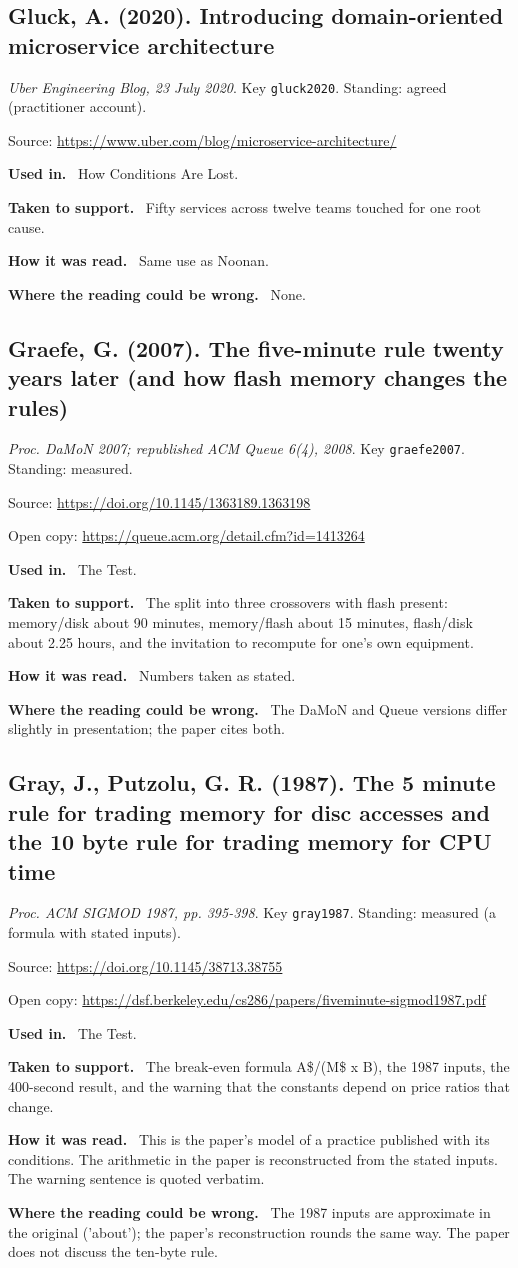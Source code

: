 \documentclass[11pt,oneside]{article}
\newcommand{\field}[1]{\par\noindent\textbf{\color{accent}#1.}\ }
\begin{document}
\hypertarget{src:gluck2020}{}
\subsection*{Gluck, A. (2020). Introducing domain-oriented microservice architecture}
\noindent\small\emph{Uber Engineering Blog, 23 July 2020}. Key \texttt{gluck2020}. Standing: agreed (practitioner account).
\par\noindent\small Source: \url{https://www.uber.com/blog/microservice-architecture/}
\normalsize
\field{Used in} How Conditions Are Lost.
\field{Taken to support} Fifty services across twelve teams touched for one root cause.
\field{How it was read} Same use as Noonan.
\field{Where the reading could be wrong} None.

\hypertarget{src:graefe2007}{}
\subsection*{Graefe, G. (2007). The five-minute rule twenty years later (and how flash memory changes the rules)}
\noindent\small\emph{Proc. DaMoN 2007; republished ACM Queue 6(4), 2008}. Key \texttt{graefe2007}. Standing: measured.
\par\noindent\small Source: \url{https://doi.org/10.1145/1363189.1363198}
\par\noindent\small Open copy: \url{https://queue.acm.org/detail.cfm?id=1413264}
\normalsize
\field{Used in} The Test.
\field{Taken to support} The split into three crossovers with flash present: memory/disk about 90 minutes, memory/flash about 15 minutes, flash/disk about 2.25 hours, and the invitation to recompute for one's own equipment.
\field{How it was read} Numbers taken as stated.
\field{Where the reading could be wrong} The DaMoN and Queue versions differ slightly in presentation; the paper cites both.

\hypertarget{src:gray1987}{}
\subsection*{Gray, J., Putzolu, G. R. (1987). The 5 minute rule for trading memory for disc accesses and the 10 byte rule for trading memory for CPU time}
\noindent\small\emph{Proc. ACM SIGMOD 1987, pp. 395-398}. Key \texttt{gray1987}. Standing: measured (a formula with stated inputs).
\par\noindent\small Source: \url{https://doi.org/10.1145/38713.38755}
\par\noindent\small Open copy: \url{https://dsf.berkeley.edu/cs286/papers/fiveminute-sigmod1987.pdf}
\normalsize
\field{Used in} The Test.
\field{Taken to support} The break-even formula A\$/(M\$ x B), the 1987 inputs, the 400-second result, and the warning that the constants depend on price ratios that change.
\field{How it was read} This is the paper's model of a practice published with its conditions. The arithmetic in the paper is reconstructed from the stated inputs. The warning sentence is quoted verbatim.
\field{Where the reading could be wrong} The 1987 inputs are approximate in the original ('about'); the paper's reconstruction rounds the same way. The paper does not discuss the ten-byte rule.
\end{document}
